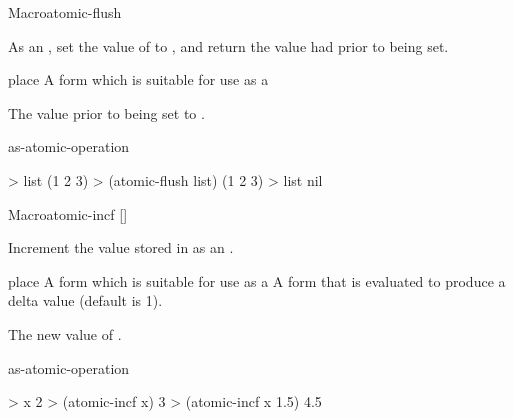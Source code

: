 \documentclass[10pt,twoside,english,pdftex]{article}
\begin{document}

\begin{functiondoc}{Macro}{atomic-flush}{ \returns{}
    }
%

\fnsyntax

\fnpurpose As an , set the value of
 to \nil, and return the value  had prior to
being set.

\fnpackage {}

\fnmodule {}

\fnargs
\begin{args}{place}
\arg[place] A form which is suitable for use as a
\end{args}

\fnreturns The  value prior to being set to \nil.

\begin{alsos}{as-atomic-operation}
\end{alsos}

\fnexample
\begin{example}
> list
(1 2 3)
> (atomic-flush list)
(1 2 3)
> list
nil
\end{example}

\end{functiondoc}


\begin{functiondoc}{Macro}{atomic-incf}{ []
      \returns{} }
%

\fnsyntax \fnpurpose Increment the value stored in  as an
          .

\fnpackage {}

\fnmodule {}

\fnargs
\begin{args}{place}
\arg[place] A form which is suitable for use as a
 A form that is evaluated to produce a delta value (default is 1).
\end{args}

\fnreturns The new value of . 

\begin{alsos}{as-atomic-operation}
\end{alsos}

\fnexamples
\begin{example}
> x
2
> (atomic-incf x)
3
> (atomic-incf x 1.5)
4.5
\end{example}

\end{functiondoc}
\end{document}

